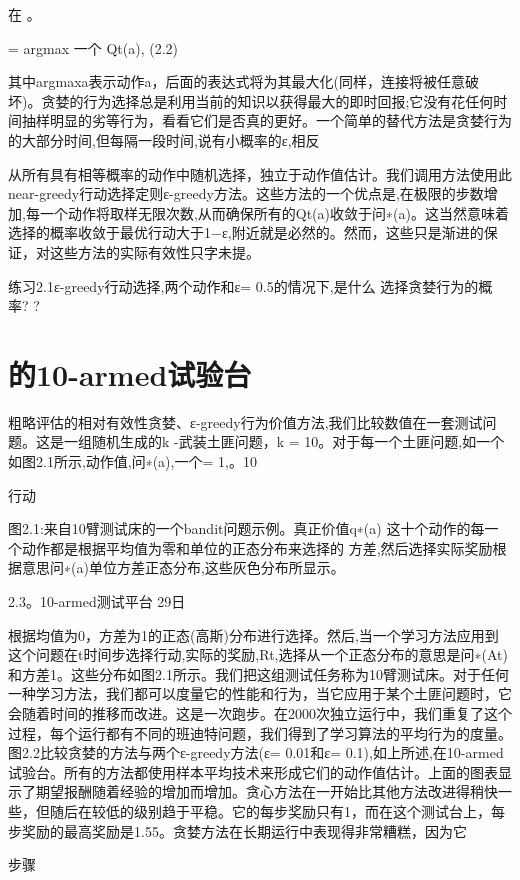 在
。

= argmax
一个
Qt(a), 					(2.2)

其中argmaxa表示动作a，后面的表达式将为其最大化(同样，连接将被任意破坏)。贪婪的行为选择总是利用当前的知识以获得最大的即时回报;它没有花任何时间抽样明显的劣等行为，看看它们是否真的更好。一个简单的替代方法是贪婪行为的大部分时间,但每隔一段时间,说有小概率的ε,相反

从所有具有相等概率的动作中随机选择，独立于动作值估计。我们调用方法使用此near-greedy行动选择定则ε-greedy方法。这些方法的一个优点是,在极限的步数增加,每一个动作将取样无限次数,从而确保所有的Qt(a)收敛于问∗(a)。这当然意味着选择的概率收敛于最优行动大于1−ε,附近就是必然的。然而，这些只是渐进的保证，对这些方法的实际有效性只字未提。

练习2.1ε-greedy行动选择,两个动作和ε= 0.5的情况下,是什么
选择贪婪行为的概率? 					?


\section{的10-armed试验台}

粗略评估的相对有效性贪婪、ε-greedy行为价值方法,我们比较数值在一套测试问题。这是一组随机生成的k -武装土匪问题，k = 10。对于每一个土匪问题,如一个如图2.1所示,动作值,问∗(a),一个= 1,。10

行动

图2.1:来自10臂测试床的一个bandit问题示例。真正价值q∗(a)
这十个动作的每一个动作都是根据平均值为零和单位的正态分布来选择的
方差,然后选择实际奖励根据意思问∗(a)单位方差正态分布,这些灰色分布所显示。

2.3。10-armed测试平台 					29日



根据均值为0，方差为1的正态(高斯)分布进行选择。然后,当一个学习方法应用到这个问题在t时间步选择行动,实际的奖励,Rt,选择从一个正态分布的意思是问∗(At)和方差1。这些分布如图2.1所示。我们把这组测试任务称为10臂测试床。对于任何一种学习方法，我们都可以度量它的性能和行为，当它应用于某个土匪问题时，它会随着时间的推移而改进。这是一次跑步。在2000次独立运行中，我们重复了这个过程，每个运行都有不同的班迪特问题，我们得到了学习算法的平均行为的度量。
图2.2比较贪婪的方法与两个ε-greedy方法(ε= 0.01和ε= 0.1),如上所述,在10-armed试验台。所有的方法都使用样本平均技术来形成它们的动作值估计。上面的图表显示了期望报酬随着经验的增加而增加。贪心方法在一开始比其他方法改进得稍快一些，但随后在较低的级别趋于平稳。它的每步奖励只有1，而在这个测试台上，每步奖励的最高奖励是1.55。贪婪方法在长期运行中表现得非常糟糕，因为它

步骤

